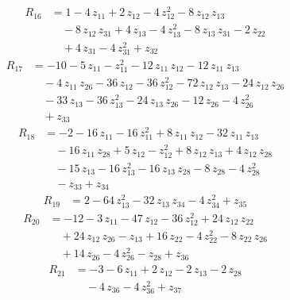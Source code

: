 \begin{equation*}\begin{aligned}
R_{16}&=1 -4\,z_{11} +2\,z_{12} -4\,z_{12}^{2} -8\,z_{12}\,z_{13} \\
&\quad -8\,z_{12}\,z_{31} +4\,z_{13} -4\,z_{13}^{2} -8\,z_{13}\,z_{31} -2\,z_{22} \\
&\quad +4\,z_{31} -4\,z_{31}^{2} +z_{32}
\end{aligned}\end{equation*}
\begin{equation*}\begin{aligned}
R_{17}&=-10 -5\,z_{11} -z_{11}^{2} -12\,z_{11}\,z_{12} -12\,z_{11}\,z_{13} \\
&\quad -4\,z_{11}\,z_{26} -36\,z_{12} -36\,z_{12}^{2} -72\,z_{12}\,z_{13} -24\,z_{12}\,z_{26} \\
&\quad -33\,z_{13} -36\,z_{13}^{2} -24\,z_{13}\,z_{26} -12\,z_{26} -4\,z_{26}^{2} \\
&\quad +z_{33}
\end{aligned}\end{equation*}
\begin{equation*}\begin{aligned}
R_{18}&=-2 -16\,z_{11} -16\,z_{11}^{2} +8\,z_{11}\,z_{12} -32\,z_{11}\,z_{13} \\
&\quad -16\,z_{11}\,z_{28} +5\,z_{12} -z_{12}^{2} +8\,z_{12}\,z_{13} +4\,z_{12}\,z_{28} \\
&\quad -15\,z_{13} -16\,z_{13}^{2} -16\,z_{13}\,z_{28} -8\,z_{28} -4\,z_{28}^{2} \\
&\quad -z_{33} +z_{34}
\end{aligned}\end{equation*}
\begin{equation*}\begin{aligned}
R_{19}&=2 -64\,z_{13}^{2} -32\,z_{13}\,z_{34} -4\,z_{34}^{2} +z_{35}
\end{aligned}\end{equation*}
\begin{equation*}\begin{aligned}
R_{20}&=-12 -3\,z_{11} -47\,z_{12} -36\,z_{12}^{2} +24\,z_{12}\,z_{22} \\
&\quad +24\,z_{12}\,z_{26} -z_{13} +16\,z_{22} -4\,z_{22}^{2} -8\,z_{22}\,z_{26} \\
&\quad +14\,z_{26} -4\,z_{26}^{2} -z_{28} +z_{36}
\end{aligned}\end{equation*}
\begin{equation*}\begin{aligned}
R_{21}&=-3 -6\,z_{11} +2\,z_{12} -2\,z_{13} -2\,z_{28} \\
&\quad -4\,z_{36} -4\,z_{36}^{2} +z_{37}
\end{aligned}\end{equation*}
